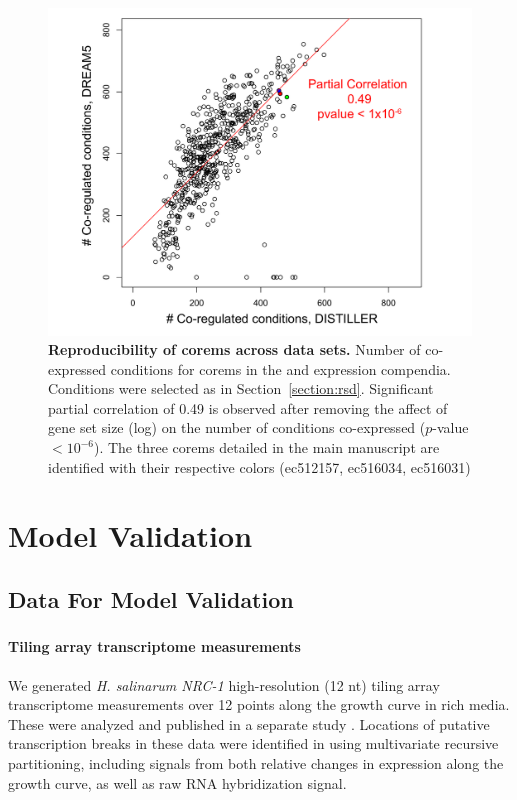 \begin{figure}[h!]
\centering
\includegraphics[width=0.6\linewidth]{figures/corem_conds_distiller_dream5.pdf}
\caption[Reproducibility of corems across data sets]{\textbf{Reproducibility of corems across data sets.} Number of co-expressed conditions for corems in the  and  expression compendia. Conditions were selected as in Section~\ref{section:rsd}. Significant partial correlation of 0.49 is observed after removing the affect of gene set size (log) on the number of conditions co-expressed ($p$-value $< 10^{-6}$). The three corems detailed in the main manuscript are identified with their respective colors ({\color{red}ec512157}, {\color{blue}ec516034}, {\color{green}ec516031})} 
\label{fig:corem_conds_distiller_dream5}
\end{figure}

\section{Model Validation}

\subsection{Data For Model Validation}

\subsubsection{ \halo} \label{halodata}

\paragraph{Tiling array transcriptome measurements}

We generated {\it H. salinarum NRC-1} high-resolution (12 nt) tiling array transcriptome measurements over 12 points along the growth curve in rich media. These were analyzed and published in a separate study \cite{koide_prevalence_2009}. Locations of putative transcription breaks in these data were identified in using multivariate recursive partitioning, including signals from both relative changes in expression along the growth curve, as well as raw RNA hybridization signal.

